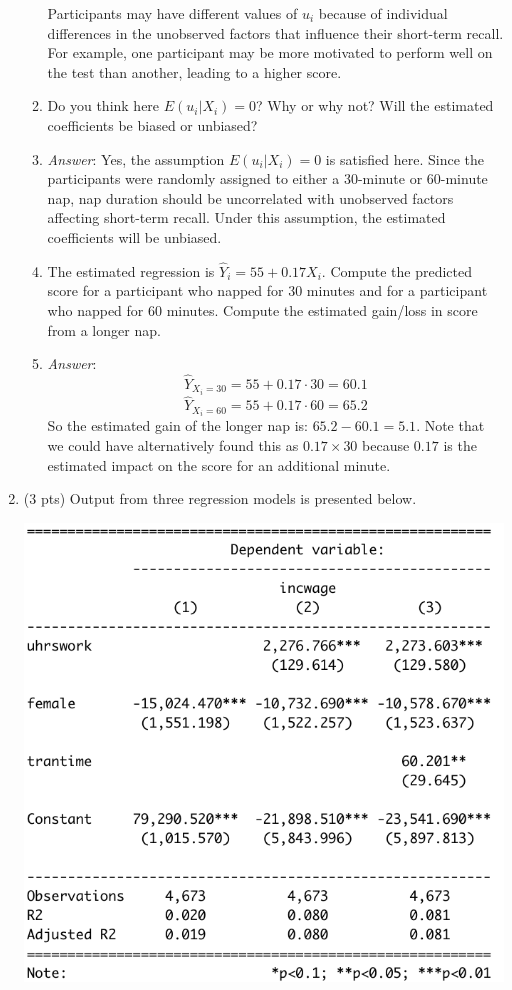 \documentclass{./../../Latex/handout}
\begin{document}
\begin{enumerate}
\begin{enumerate}
  Participants may have different values of $u_i$ because of individual differences in the unobserved factors that influence their short-term recall. For example, one participant may be more motivated to perform well on the test than another, leading to a higher score.  \\
  \item Do you think here $E(u_i|X_i) =0$? Why or why not? Will the estimated coefficients be biased or unbiased? 
  \item[] \textit{Answer}: Yes, the assumption $E(u_i|X_i) =0$ is satisfied here. Since the participants were randomly assigned to either a 30-minute or 60-minute nap, nap duration should be uncorrelated with unobserved factors affecting short-term recall. Under this assumption, the estimated coefficients will be unbiased.	\\
\item The estimated regression is $ \hat{Y}_i = 55 + 0.17 X_i $. Compute the predicted score for a participant who napped for 30 minutes and for a participant who napped for 60 minutes. Compute the estimated gain/loss in score from a longer nap. 
\item[] \textit{Answer}: $$ \hat{Y}_{X_i=30} = 55 + 0.17 \cdot 30 = 60.1  $$
	$$ \hat{Y}_{X_i=60} = 55 + 0.17 \cdot 60 = 65.2 $$
	So the estimated gain of the longer nap is: $65.2-60.1=5.1$. Note that we could have alternatively found this as $0.17\times 30$ because $0.17$ is the estimated impact on the score for an additional minute.\\
\end{enumerate}

\item (3 pts) 
Output from three regression models is presented below. 
\begin{center}
\includegraphics[scale=0.55]{reg.png} 	
\end{center}


\end{enumerate}
\end{document}
